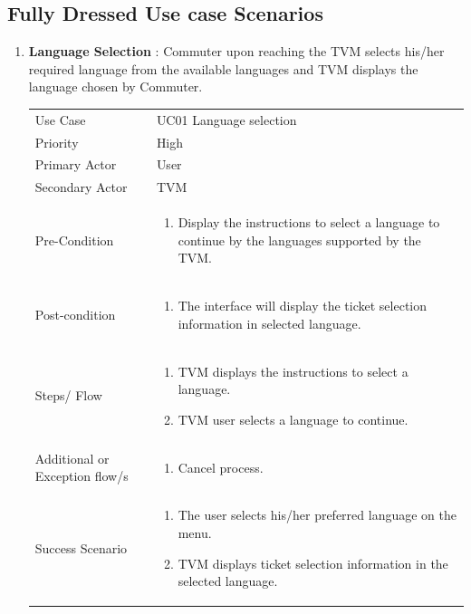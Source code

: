 \documentclass[15pt]{article}
\begin{document}
\subsection{\Large{Fully Dressed Use case Scenarios}}
 \begin{enumerate}[leftmargin=2em, itemsep=0pt, parsep=0pt, , font=\Large\bfseries]
 \item {\Large\bfseries{Language Selection}} : Commuter upon reaching the TVM selects his/her required language from the available languages and TVM displays the language chosen by Commuter.
\newline
\newline
\begin{tabularx}{1\textwidth} { 
  | >{\raggedright\arraybackslash}X 
  | >{\raggedright\arraybackslash}X 
  | }
 \hline
 Use Case & UC01 Language selection \\
 Priority & High \\
 Primary Actor  & User \\
 Secondary Actor  & TVM \\

 Pre-Condition  & 
 \begin{enumerate}
  \item Display the instructions to select a language to continue by the languages supported by the TVM.
  \end{enumerate}
  \\
  
   Post-condition  & \begin{enumerate}
  \item The interface will display the ticket selection information in selected language.
  \end{enumerate}
  \\
  
  Steps/ Flow  & \begin{enumerate}
  \item  TVM displays the instructions to select a language.
  \item TVM user selects a language to continue.
  \end{enumerate}
  \\
  
   Additional or Exception flow/s  & \begin{enumerate}
  \item  Cancel process.
  \end{enumerate}
  \\
    
   Success Scenario  & \begin{enumerate}
  \item  The user selects his/her preferred language on the menu.
  \item  TVM displays ticket selection information in the selected language.
  \end{enumerate}
  \\


\end{tabularx}
\end{enumerate}
\end{document}
